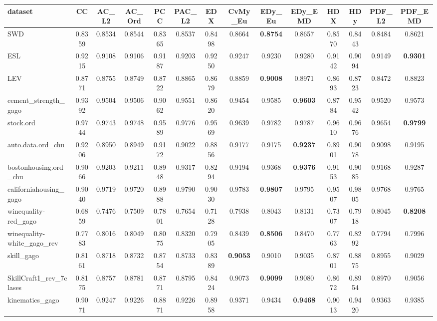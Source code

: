 \begin{tabular}{lccccccccccccc}
\toprule
dataset & CC & AC_L2 & AC_Ord & PCC & PAC_L2 & EDX & CvMy_Eu & EDy_Eu & EDy_EMD & HDX & HDy & PDF_L2 & PDF_EMD \\
\midrule
SWD & 0.8359 & 0.8534 & 0.8544 & 0.8365 & 0.8537 & 0.8498 & 0.8664 & \textbf{0.8754} & 0.8657 & 0.8570 & 0.8443 & 0.8484 & 0.8621 \\
ESL & 0.9215 & 0.9108 & 0.9106 & 0.9187 & 0.9203 & 0.9250 & 0.9247 & 0.9230 & 0.9280 & 0.9142 & 0.9094 & 0.9149 & \textbf{0.9301} \\
LEV & 0.8771 & 0.8755 & 0.8749 & 0.8722 & 0.8865 & 0.8679 & 0.8859 & \textbf{0.9008} & 0.8971 & 0.8693 & 0.8723 & 0.8472 & 0.8823 \\
cement_strength_gago & 0.9392 & 0.9504 & 0.9506 & 0.9062 & 0.9551 & 0.8620 & 0.9454 & 0.9585 & \textbf{0.9603} & 0.8784 & 0.9542 & 0.9520 & 0.9573 \\
stock.ord & 0.9744 & 0.9743 & 0.9748 & 0.9589 & 0.9776 & 0.9569 & 0.9639 & 0.9782 & 0.9787 & 0.9610 & 0.9676 & 0.9654 & \textbf{0.9799} \\
auto.data.ord_chu & 0.9206 & 0.8950 & 0.8949 & 0.9172 & 0.9022 & 0.8856 & 0.9177 & 0.9175 & \textbf{0.9237} & 0.8901 & 0.9078 & 0.9098 & 0.9195 \\
bostonhousing.ord_chu & 0.9066 & 0.9203 & 0.9211 & 0.8948 & 0.9317 & 0.8294 & 0.9194 & 0.9368 & \textbf{0.9376} & 0.9153 & 0.9085 & 0.9168 & 0.9287 \\
californiahousing_gago & 0.9040 & 0.9719 & 0.9720 & 0.8988 & 0.9790 & 0.9030 & 0.9783 & \textbf{0.9807} & 0.9795 & 0.9507 & 0.9805 & 0.9768 & 0.9765 \\
winequality-red_gago & 0.6859 & 0.7476 & 0.7509 & 0.7801 & 0.7654 & 0.7128 & 0.7938 & 0.8043 & 0.8131 & 0.7307 & 0.7918 & 0.8045 & \textbf{0.8208} \\
winequality-white_gago_rev & 0.7783 & 0.8016 & 0.8049 & 0.8075 & 0.8320 & 0.7905 & 0.8439 & \textbf{0.8506} & 0.8470 & 0.7763 & 0.8292 & 0.7794 & 0.7996 \\
skill_gago & 0.8161 & 0.8718 & 0.8732 & 0.8754 & 0.8733 & 0.8389 & \textbf{0.9053} & 0.9010 & 0.9035 & 0.8701 & 0.8875 & 0.8955 & 0.9029 \\
SkillCraft1_rev_7clases & 0.8175 & 0.8757 & 0.8781 & 0.8771 & 0.8795 & 0.8424 & 0.9073 & \textbf{0.9099} & 0.9080 & 0.8672 & 0.8954 & 0.8970 & 0.9056 \\
kinematics_gago & 0.9071 & 0.9247 & 0.9226 & 0.8871 & 0.9226 & 0.8958 & 0.9371 & 0.9434 & \textbf{0.9468} & 0.9013 & 0.9420 & 0.9363 & 0.9385 \\

\end{tabular}
